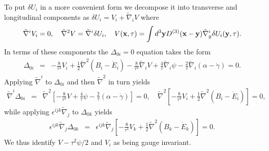 \documentclass[aps,onecolumn,10pt]{revtex4}
\numberwithin{equation}{section}
\numberwithin{equation}{section}
\begin{document}
To put $\delta U_i$ in a more convenient form we decompose it into transverse and longitudinal components  as $\delta U_i=V_i+\tilde{\nabla}_iV$ where 
%
\begin{eqnarray}
\tilde{\nabla}^iV_i=0,\quad \tilde{\nabla}^2V=\tilde{\nabla}^i\delta U_i,\quad V({\bf x},\tau)=\int d^3{\bf y}D^{(3)}({\bf x}-{\bf y})\tilde{\nabla}^i_y\delta U_i({\bf y}, \tau).
\label{8.14}
\end{eqnarray}
%
In terms of these components the $\Delta_{0i}=0$ equation takes the form
%
\begin{eqnarray}
\Delta_{0i}&=&-\frac{8}{\tau^3}V_{i}+\frac{1}{2}\tilde{\nabla}^2(B_i-\dot{E}_i)-\frac{8}{\tau^3}\tilde{\nabla}_iV+\frac{4}{\tau}\tilde{\nabla}_i\psi
 -\frac{2}{\tau}\tilde{\nabla}_i(\alpha-\dot{\gamma})=0.
 \label{8.15}
\end{eqnarray}
Applying $\tilde{\nabla}^i$ to $\Delta_{0i}$ and then $\tilde{\nabla}^2$ in turn yields
%
\begin{eqnarray}
\tilde{\nabla}^i\Delta_{0i}&=&\tilde{\nabla}^2\left[-\frac{8}{\tau^3}V+\frac{4}{\tau}\psi
 -\frac{2}{\tau}(\alpha-\dot{\gamma})\right]=0,\quad \tilde{\nabla}^2\left[-\frac{8}{\tau^3}V_{i}+\frac{1}{2}\tilde{\nabla}^2(B_i-\dot{E}_i)\right]=0,
 \label{8.16}
 \end{eqnarray}
 while applying $\epsilon^{ijk}\tilde{\nabla}_j$ to $\Delta_{0k}$ yields
 \begin{eqnarray}
 \epsilon^{ijk}\tilde{\nabla}_j\Delta_{0k}&=&\epsilon^{ijk}\tilde{\nabla}_j\left[-\frac{8}{\tau^3}V_{k}+\frac{1}{2}\tilde{\nabla}^2(B_k-\dot{E}_k)\right]=0.
 \label{8.17}
\end{eqnarray}
We thus identify $V-\tau^2\psi/2$ and $V_i$ as being gauge invariant.
\end{document}
